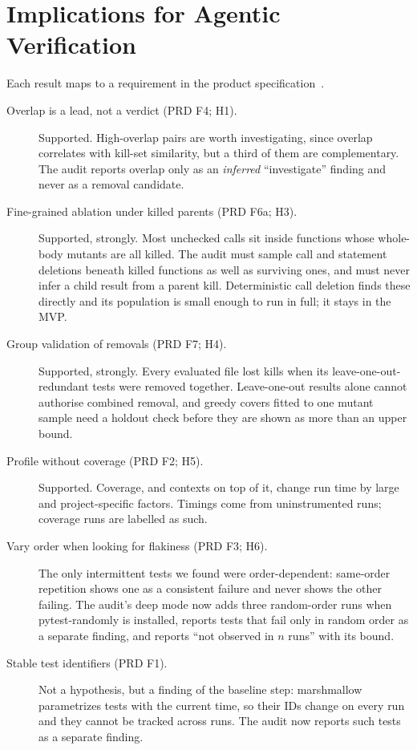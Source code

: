 \section{Implications for Agentic Verification}
\label{sec:implications}

Each result maps to a requirement in the product specification~\cite{tsaprd}.

\begin{description}
  \item[Overlap is a lead, not a verdict (PRD F4; H1).] Supported. High-overlap pairs are worth investigating, since overlap correlates with kill-set similarity, but a third of them are complementary. The audit reports overlap only as an \emph{inferred} ``investigate'' finding and never as a removal candidate.
  \item[Fine-grained ablation under killed parents (PRD F6a; H3).] Supported, strongly. Most unchecked calls sit inside functions whose whole-body mutants are all killed. The audit must sample call and statement deletions beneath killed functions as well as surviving ones, and must never infer a child result from a parent kill. Deterministic call deletion finds these directly and its population is small enough to run in full; it stays in the MVP.
  \item[Group validation of removals (PRD F7; H4).] Supported, strongly. Every evaluated file lost kills when its leave-one-out-redundant tests were removed together. Leave-one-out results alone cannot authorise combined removal, and greedy covers fitted to one mutant sample need a holdout check before they are shown as more than an upper bound.
  \item[Profile without coverage (PRD F2; H5).] Supported. Coverage, and contexts on top of it, change run time by large and project-specific factors. Timings come from uninstrumented runs; coverage runs are labelled as such.
  \item[Vary order when looking for flakiness (PRD F3; H6).] The only intermittent tests we found were order-dependent: same-order repetition shows one as a consistent failure and never shows the other failing. The audit's deep mode now adds three random-order runs when pytest-randomly is installed, reports tests that fail only in random order as a separate finding, and reports ``not observed in $n$ runs'' with its bound.
  \item[Stable test identifiers (PRD F1).] Not a hypothesis, but a finding of the baseline step: marshmallow parametrizes tests with the current time, so their IDs change on every run and they cannot be tracked across runs. The audit now reports such tests as a separate finding.

\end{description}
